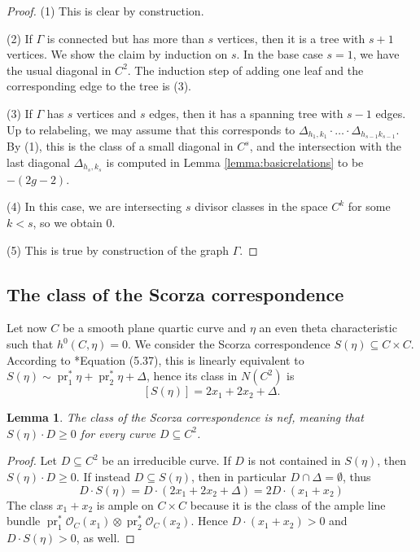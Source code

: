 \documentclass[12pt]{article}
\newtheorem{lemma}[theorem]{Lemma}
\numberwithin{equation}{section}
\theoremstyle{definition}
\DeclareMathOperator{\pr}{pr}
\begin{document}
\begin{proof}
	(1) This is clear by construction.
	
	(2)  If $\Gamma$ is connected but has more than $s$ vertices, then it is a tree with $s+1$ vertices. We show the claim by induction on $s$. In the base case $s=1$, we have the usual diagonal in $C^2$. The induction step of adding one leaf and the corresponding edge to the tree is (3).
	
	(3) If $\Gamma$ has $s$ vertices and $s$ edges, then it has a spanning tree with $s-1$ edges. Up to relabeling, we may assume that this corresponds to $\Delta_{h_1,k_1}\cdot \dotsc \cdot \Delta_{h_{s-1}k_{s-1}}$. By (1), this is the class of a small diagonal in $C^s$, and the intersection with the last diagonal $\Delta_{h_s,k_s}$ is computed in Lemma \ref{lemma:basicrelations} to be $-(2g-2)$.
	
	(4) In this case, we are intersecting $s$ divisor classes in the space $C^k$ for some $k<s$, so we obtain $0$.
	
	(5) This is true by construction of the graph $\Gamma$. 
\end{proof}


\subsection{The class of the Scorza correspondence}

Let now $C$ be a smooth plane quartic curve and $\eta$ an even theta characteristic such that $h^0(C,\eta)=0$. We consider the Scorza correspondence $S(\eta)\subseteq C\times C$.  According to \cite{Dolgachev}*{Equation (5.37)}, this is linearly equivalent to  $S(\eta) \sim \pr_1^*\eta + \pr_2^*\eta + \Delta$, hence its class in $N(C^2)$ is
\begin{equation}\label{eq:scorzaclass} 
[S(\eta)] = 2x_1+2x_2+\Delta. 
\end{equation}

\begin{lemma}\label{lemma:scorzanef}
	The class of the Scorza correspondence is nef, meaning that $S(\eta) \cdot D \geq 0$ for every curve $D\subseteq  C^2$.
\end{lemma}
\begin{proof}
	Let $D\subseteq C^2$ be an irreducible curve. If $D$ is not contained in $S(\eta)$, then $S(\eta)\cdot D \geq 0$. If instead $D\subseteq S(\eta)$, then in particular $D\cap \Delta = \emptyset$, thus
	\[ D\cdot S(\eta) = D\cdot (2x_1+2x_2+\Delta) = 2D\cdot (x_1+x_2) \]
	The class $x_1+x_2$ is ample on $C\times C$ because it is the class of the ample line bundle $\pr_1^*\mathcal{O}_C(x_1)\otimes \pr_2^*\mathcal{O}_C(x_2)$. Hence $D\cdot (x_1+x_2) >0$ and $D\cdot S(\eta) >0$, as well. 
\end{proof}
\end{document}
